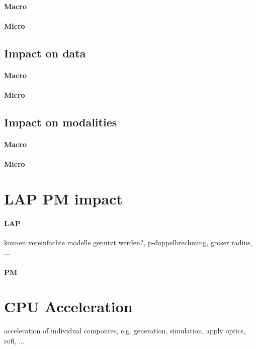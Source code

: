 \paragraph{Macro}
\paragraph{Micro}
% 
\subsection{Impact on data}
%
\begin{figure}[!t]
\centering
{}
\caption{}
\label{fig:foo_p_zoom}
\end{figure}
% 
\begin{figure}[!t]
\centering
{}
\caption{}
\label{fig:foo_r}
\end{figure}
% 
\begin{figure}[!t]
\centering
{}
\caption{}
\label{fig:foo_r_zoom}
\end{figure}
% 
\begin{figure}[!t]
\centering
{}
\caption{}
\label{fig:foo_p_noise}
\end{figure}
% 
\begin{figure}[!t]
\centering
{}
\caption{}
\label{fig:foo_r_noise}
\end{figure}
% 
\paragraph{Macro}
\paragraph{Micro}
% 
\subsection{Impact on modalities}
\paragraph{Macro}
\paragraph{Micro}
% 
\section{LAP PM impact}
\paragraph{LAP}
können vereinfachte modelle genutzt werden?, p-doppelbrechnung, gröser radius, ...
\paragraph{PM}
% 
\section{CPU Acceleration}
% 
acceleration of individual compontes, e.g. generation, simulation, apply optics, rofl, ...
